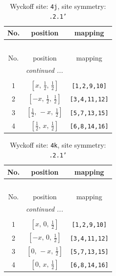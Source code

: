 \documentclass[fleqn,8pt]{jsarticle}
\begin{document}
\begin{longtable}{ccc}
\caption{Wyckoff site: {\tt 4j}, site symmetry: {\tt .2.1'}}
 \\
 \hline \hline
No. & position & mapping \\ \hline \endfirsthead

\multicolumn{2}{l}{\tablename\ \thetable{}} \\
 \hline \hline
No. & position & mapping \\ \hline \endhead

 \hline \hline
\multicolumn{2}{r}{\footnotesize\it continued ...} \\ \endfoot

 \hline \hline
\multicolumn{2}{r}{} \\ \endlastfoot

1 & $\left[ x,\, \frac{1}{2},\, \frac{1}{2} \right]$ & {\tt [1,2,9,10]} \\ \hline
2 & $\left[ - x,\, \frac{1}{2},\, \frac{1}{2} \right]$ & {\tt [3,4,11,12]} \\ \hline
3 & $\left[ \frac{1}{2},\, - x,\, \frac{1}{2} \right]$ & {\tt [5,7,13,15]} \\ \hline
4 & $\left[ \frac{1}{2},\, x,\, \frac{1}{2} \right]$ & {\tt [6,8,14,16]} \\
\end{longtable}
\renewcommand{\arraystretch}{1.2}
\begin{longtable}{ccc}
\caption{Wyckoff site: {\tt 4k}, site symmetry: {\tt .2.1'}}
 \\
 \hline \hline
No. & position & mapping \\ \hline \endfirsthead

\multicolumn{2}{l}{\tablename\ \thetable{}} \\
 \hline \hline
No. & position & mapping \\ \hline \endhead

 \hline \hline
\multicolumn{2}{r}{\footnotesize\it continued ...} \\ \endfoot

 \hline \hline
\multicolumn{2}{r}{} \\ \endlastfoot

1 & $\left[ x,\, 0,\, \frac{1}{2} \right]$ & {\tt [1,2,9,10]} \\ \hline
2 & $\left[ - x,\, 0,\, \frac{1}{2} \right]$ & {\tt [3,4,11,12]} \\ \hline
3 & $\left[ 0,\, - x,\, \frac{1}{2} \right]$ & {\tt [5,7,13,15]} \\ \hline
4 & $\left[ 0,\, x,\, \frac{1}{2} \right]$ & {\tt [6,8,14,16]} \\
\end{longtable}
\end{document}
